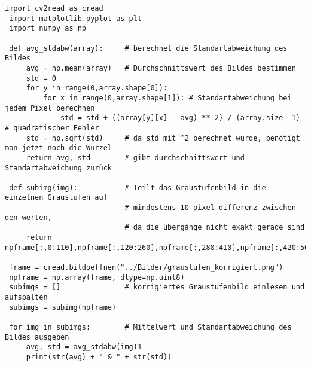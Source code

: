 \begin{lstlisting}[style=PYTHON,frame=single,
 caption=einteilung der Graustufen sowie die Berechnung derer Mittelwerte und StdAbw.
 captionpos=b,
 label=lst:Graustufen]
 import cv2read as cread
 import matplotlib.pyplot as plt
 import numpy as np

 def avg_stdabw(array):		# berechnet die Standartabweichung des Bildes
     avg = np.mean(array)   # Durchschnittswert des Bildes bestimmen
     std = 0
     for y in range(0,array.shape[0]):
         for x in range(0,array.shape[1]): # Standartabweichung bei jedem Pixel berechnen
             std = std + ((array[y][x] - avg) ** 2) / (array.size -1) # quadratischer Fehler
     std = np.sqrt(std)		# da std mit ^2 berechnet wurde, benötigt man jetzt noch die Wurzel
     return avg, std		# gibt durchschnittswert und Standartabweichung zurück

 def subimg(img):			# Teilt das Graustufenbild in die einzelnen Graustufen auf
 							# mindestens 10 pixel differenz zwischen den werten,
 							# da die übergänge nicht exakt gerade sind
     return npframe[:,0:110],npframe[:,120:260],npframe[:,280:410],npframe[:,420:560],npframe[0:460,570:640]
     
 frame = cread.bildoeffnen("../Bilder/graustufen_korrigiert.png")
 npframe = np.array(frame, dtype=np.uint8)
 subimgs = [] 				# korrigiertes Graustufenbild einlesen und aufspalten
 subimgs = subimg(npframe)

 for img in subimgs:		# Mittelwert und Standartabweichung des Bildes ausgeben
     avg, std = avg_stdabw(img)1
     print(str(avg) + " & " + str(std))
\end{lstlisting}